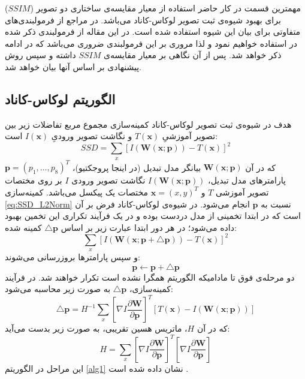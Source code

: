 \documentclass[11pt,a4paper,twocolumn]{article}
\newcommand{\warp}{\mathbf{W}(\mathbf{x};\mathbf{p})}
\newcommand{\IWarp}{I(\mathbf{W}(\mathbf{x};\mathbf{p}))}
\newcommand{\roundB}[2]{\frac{\partial{\mathbf{#1}}}{\partial{\mathbf{#2}}}}
\begin{document}
مهمترین قسمت در کار حاضر استفاده از معیار مقایسه‌ی ساختاری دو تصویر ($SSIM$) برای بهبود شیوه‌ی ثبت تصویر لوکاس-کاناد\cite{Lucas81iterative} می‌باشد. در مراجع از فرمولبندی‌های متفاوتی برای بیان این شیوه استفاده شده است. در این مقاله از فرمولبندی ذکر شده در \cite{Baker04lucas-kanade20part1} استفاده خواهیم نمود و لذا مروری بر این فرمولبندی ضروری می‌باشد که در ادامه ذکر خواهد شد. پس از آن نگاهی بر معیار مقایسه‌ی $SSIM$ داشته و سپس روش پیشنهادی بر اساس آنها بیان خواهد شد.

\subsection{الگوریتم لوکاس-کاناد}
 هدف در شیوه‌ی ثبت تصویر لوکاس-کاناد\cite{Lucas81iterative} کمینه‌سازی مجموع مربع تفاضلات زیر بین تصویر آموزشیِ $T(\mathbf{x})$ و نگاشت تصویر ورودیِ $I(\mathbf{x})$ است:
 \begin{equation}\label{eq:SSD_L2Norm}
    SSD=\sum_x[\IWarp-T(\mathbf{x})]^2
\end{equation}
که در آن $\warp$ بیانگر مدل تبدیل‌ (در اینجا پروجکتیو)، $\mathbf{p}=(p_1,\dots,p_8)^T$ پارامترهای مدل تبدیل، $\IWarp$ نگاشت تصویر ورودی $I$ بر روی مختصات تصویر آموزشی $T$ و $\mathbf{x} =(x,y)^T$ مختصات یک پیکسل می‌باشد.
 کمینه‌سازی \eqref{eq:SSD_L2Norm} نسبت به $\mathbf{p}$ انجام می‌شود. 
در شیوه‌ی لوکاس-کاناد فرض بر آن است که در ابتدا تخمینی از مدل دردست بوده و در یک فرآیند تکراری این تخمین بهبود داده می‌شود؛
در هر دور ابتدا عبارت زیر بر اساس $\triangle\mathbf{p}$ کمینه شده:
\begin{equation}\label{eq:SSD_L2Norm_deltap}
    \sum_x[I(\mathbf{W}(\mathbf{x;\mathbf{p+\triangle p}}))-T(\mathbf{x})]^2
\end{equation}
 و سپس پارامترها بروزرسانی می‌شوند:
\begin{equation}
    \mathbf{p}\leftarrow\mathbf{p+\triangle p}
\end{equation}
دو مرحله‌ی فوق تا مادامیکه الگوریتم همگرا نشده است تکرار خواهند شد. در فرآیند کمینه‌سازی، $\mathbf{\triangle p}$ به صورت زیر محاسبه می‌شود:
\begin{equation}\label{eq:deltap}
    \triangle\mathbf{p} = H^{-1} \sum_x[\nabla I\roundB{W}{p}]^T[T(\mathbf{x})-\IWarp]
\end{equation}
که در آن $H$، ماتریس هسین تقریبی، به صورت زیر بدست می‌آید:
\begin{equation}\label{eq:Hessian}
    H = \sum_x[\nabla I\roundB{W}{p}]^T[\nabla I\roundB{W}{p}]
\end{equation}
این مراحل در الگوریتم \ref{alg1} نشان داده شده است \cite{Baker04lucas-kanade20part1}.
\end{document}
